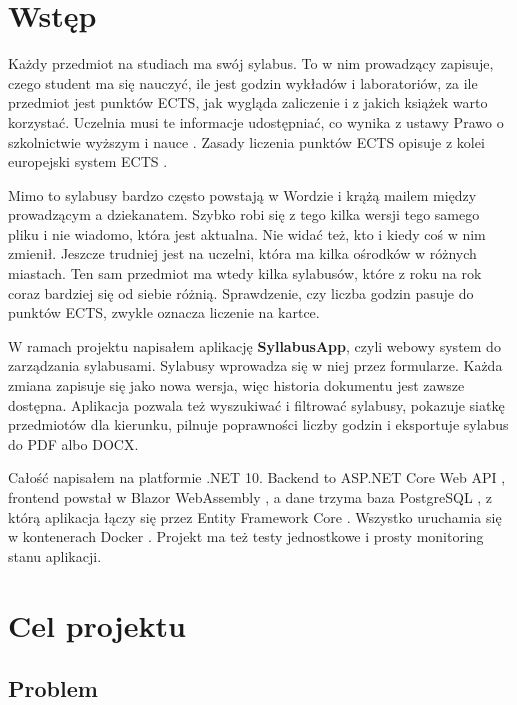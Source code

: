 \documentclass[times]{san}
\begin{document}
\maketitlepage
\spistresci

\section{Wstęp}

Każdy przedmiot na studiach ma swój sylabus. To w nim prowadzący zapisuje, czego student ma się nauczyć, ile jest godzin wykładów i laboratoriów, za ile przedmiot jest punktów ECTS, jak wygląda zaliczenie i z jakich książek warto korzystać. Uczelnia musi te informacje udostępniać, co wynika z ustawy Prawo o szkolnictwie wyższym i nauce \cite{ustawa_psw}. Zasady liczenia punktów ECTS opisuje z kolei europejski system ECTS \cite{ects_guide}.

Mimo to sylabusy bardzo często powstają w Wordzie i krążą mailem między prowadzącym a dziekanatem. Szybko robi się z tego kilka wersji tego samego pliku i nie wiadomo, która jest aktualna. Nie widać też, kto i kiedy coś w nim zmienił. Jeszcze trudniej jest na uczelni, która ma kilka ośrodków w różnych miastach. Ten sam przedmiot ma wtedy kilka sylabusów, które z roku na rok coraz bardziej się od siebie różnią. Sprawdzenie, czy liczba godzin pasuje do punktów ECTS, zwykle oznacza liczenie na kartce.

W ramach projektu napisałem aplikację \textbf{SyllabusApp}, czyli webowy system do zarządzania sylabusami. Sylabusy wprowadza się w niej przez formularze. Każda zmiana zapisuje się jako nowa wersja, więc historia dokumentu jest zawsze dostępna. Aplikacja pozwala też wyszukiwać i filtrować sylabusy, pokazuje siatkę przedmiotów dla kierunku, pilnuje poprawności liczby godzin i eksportuje sylabus do PDF albo DOCX.

Całość napisałem na platformie .NET 10. Backend to ASP.NET Core Web API \cite{ms_aspnetcore}, frontend powstał w Blazor WebAssembly \cite{ms_blazor}, a dane trzyma baza PostgreSQL \cite{postgresql}, z którą aplikacja łączy się przez Entity Framework Core \cite{ms_efcore}. Wszystko uruchamia się w kontenerach Docker \cite{docker}. Projekt ma też testy jednostkowe i prosty monitoring stanu aplikacji.

\section{Cel projektu}

\subsection{Problem}
\end{document}
